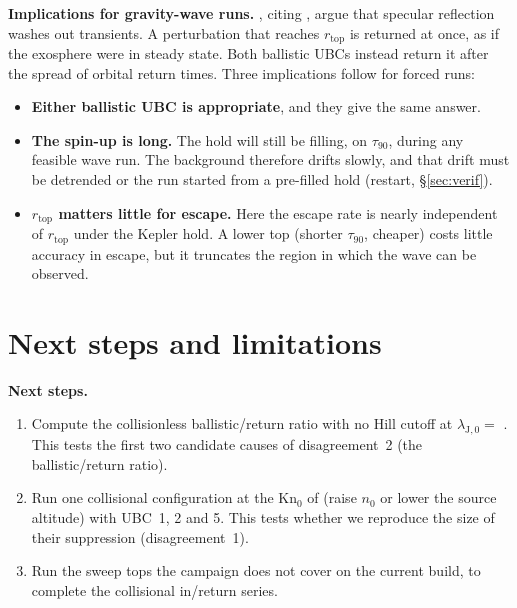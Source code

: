 \documentclass[10pt]{article}
\newcommand{\para}[1]{\textbf{#1}\hspace{0.5em}}
\newcommand{\tauf}{\tau_{90}}
\newcommand{\rtop}{r_\mathrm{top}}
\begin{document}
\para{Implications for gravity-wave runs.} \citet{cm21}, citing \citet{leclercq20}, argue that specular reflection washes out transients. A perturbation that reaches $\rtop$ is returned at once, as if the exosphere were in steady state. Both ballistic UBCs instead return it after the spread of orbital return times. Three implications follow for forced runs:
\begin{itemize}
  \item \textbf{Either ballistic UBC is appropriate}, and they give the same answer.
  \item \textbf{The spin-up is long.} The hold will still be filling, on $\tauf$, during any feasible wave run. The background therefore drifts slowly, and that drift must be detrended or the run started from a pre-filled hold (restart, \S\ref{sec:verif}).
  \item \textbf{$\rtop$ matters little for escape.} Here the escape rate is nearly independent of $\rtop$ under the Kepler hold. A lower top (shorter $\tauf$, cheaper) costs little accuracy in escape, but it truncates the region in which the wave can be observed.
\end{itemize}

\section{Next steps and limitations}\label{sec:open}

\para{Next steps.}
\begin{enumerate}[leftmargin=1.6em, itemsep=1pt]
  \item Compute the collisionless ballistic/return ratio with no Hill cutoff at $\lambda_{\mathrm{J},0} = $ \pLambdaZero{}. This tests the first two candidate causes of disagreement~2 (the ballistic/return ratio).
  \item Run one collisional configuration at the $\mathrm{Kn}_0$ of \citet{cm21} (raise $n_0$ or lower the source altitude) with UBC~1, 2 and 5. This tests whether we reproduce the size of their suppression (disagreement~1).
  \item Run the sweep tops the campaign does not cover on the current build, to complete the collisional in/return series.
\end{enumerate}
\end{document}
